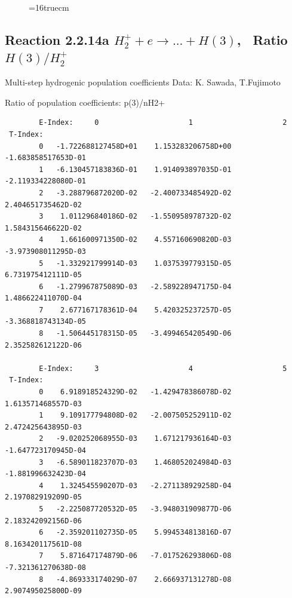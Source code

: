 \documentclass[12pt,dvipdfmx]{article}
\begin{document}
\begin{small}
\begin{verbatim}
\end{verbatim}\end{small}
\begin{figure} \label{2.2.5ly}
\epsfxsize=16truecm
\end{figure}

\newpage
\subsection{
Reaction 2.2.14a $ H_2^+ + e \rightarrow ...+ H(3) $, \  Ratio $H(3)/H_2^+ $
}

 Multi-step hydrogenic population coefficients
 Data: K. Sawada, T.Fujimoto \cite{kn:Sawada}

 Ratio of population coefficients: p(3)/nH2+


\begin{small}\begin{verbatim}
        E-Index:     0                     1                     2
 T-Index:
        0   -1.722688127458D+01    1.153283206758D+00   -1.683858517653D-01
        1   -6.130457183836D-01    1.914093897035D-01   -2.119334228080D-01
        2   -3.288796872020D-02   -2.400733485492D-02    2.404651735462D-02
        3    1.011296840186D-02   -1.550958978732D-02    1.584315646622D-02
        4    1.661600971350D-02    4.557160690820D-03   -3.973908011295D-03
        5   -1.332921799914D-03    1.037539779315D-05    6.731975412111D-05
        6   -1.279967875089D-03   -2.589228947175D-04    1.486622411070D-04
        7    2.677167178361D-04    5.420325237257D-05   -3.368818743134D-05
        8   -1.506445178315D-05   -3.499465420549D-06    2.352582612122D-06

        E-Index:     3                     4                     5
 T-Index:
        0    6.918918524329D-02   -1.429478386078D-02    1.613571468557D-03
        1    9.109177794808D-02   -2.007505252911D-02    2.472425643895D-03
        2   -9.020252068955D-03    1.671217936164D-03   -1.647723170945D-04
        3   -6.589011823707D-03    1.468052024984D-03   -1.881996632423D-04
        4    1.324545590207D-03   -2.271138929258D-04    2.197082919209D-05
        5   -2.225087720532D-05   -3.948031909877D-06    2.183242092156D-06
        6   -2.359201102735D-05    5.994534813816D-07    8.163420117561D-08
        7    5.871647174879D-06   -7.017526293806D-08   -7.321361270638D-08
        8   -4.869333174029D-07    2.666937131278D-08    2.907495025800D-09


\end{verbatim}
\end{small}
\end{document}
